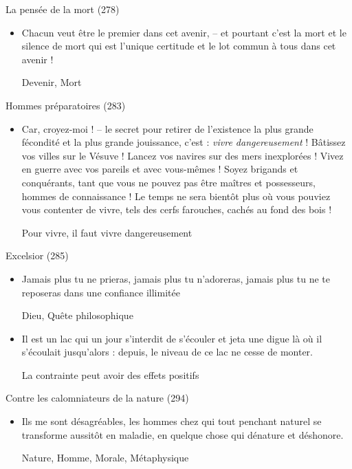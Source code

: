 \documentclass[french,a4paper,11pt,answers]{exam}
\newcommand{\cit}[2]{\og #1 \fg{} \begin{solution}{ #2 }\end{solution}} %
\begin{document}
	\begin{cadre}{La pensée de la mort (278)}
		\begin{itemize}
			\item \cit{Chacun veut être le premier dans cet avenir, -- et pourtant c'est la mort et le silence de mort qui est l'unique certitude et le lot commun à tous dans cet avenir !}
				{Devenir, Mort}
		\end{itemize}
	\end{cadre}
	
	\begin{cadre}{Hommes préparatoires (283)}
		\begin{itemize}
			\item \cit{Car, croyez-moi ! -- le secret pour retirer de l'existence la plus grande fécondité et la plus grande jouissance, c'est : \emph{vivre dangereusement} ! Bâtissez vos villes sur le Vésuve ! Lancez vos navires sur des mers inexplorées ! Vivez en guerre avec vos pareils et avec vous-mêmes ! Soyez brigands et conquérants, tant que vous ne pouvez pas être maîtres et possesseurs, hommes de connaissance ! Le temps ne sera bientôt plus où vous pouviez vous contenter de vivre, tels des cerfs farouches, cachés au fond des bois !}
				{Pour vivre, il faut vivre dangereusement}
		\end{itemize}
	\end{cadre}
	
	\begin{cadre}{Excelsior (285)}
		\begin{itemize}
			\item \cit{Jamais plus tu ne prieras, jamais plus tu n'adoreras, jamais plus tu ne te reposeras dans une confiance illimitée}
				{Dieu, Quête philosophique}
			\item \cit{Il est un lac qui un jour s'interdit de s'écouler et jeta une digue là où il s'écoulait jusqu'alors : depuis, le niveau de ce lac ne cesse de monter.}
				{La contrainte peut avoir des effets positifs}
		\end{itemize}
	\end{cadre}
	
	\begin{cadre}{Contre les calomniateurs de la nature (294)}
		\begin{itemize}
			\item \cit{Ils me sont désagréables, les hommes chez qui tout penchant naturel se transforme aussitôt en maladie, en quelque chose qui dénature et déshonore.}
				{Nature, Homme, Morale, Métaphysique}
		\end{itemize}
	\end{cadre}
\end{document}
